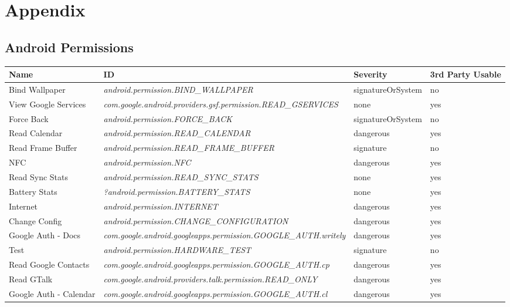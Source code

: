 \chapter{Appendix}
\section{Android Permissions}

\begin{small}
\begin{longtable}{p{3cm}|p{8cm}|p{2.5cm}|p{1.5cm}}
Name & ID & Severity &3rd Party Usable \\
\hline

Bind Wallpaper & \textit{android.permission.\-BIND\_WALLPAPER} & signatureOrSystem & no \\
View Google Services & \textit{com.google.android.providers.gsf.permission.\-READ\_GSERVICES} & none & yes \\
Force Back & \textit{android.permission.\-FORCE\_BACK} & signatureOrSystem & no \\
Read Calendar & \textit{android.permission.\-READ\_CALENDAR} & dangerous & yes \\
Read Frame Buffer & \textit{android.permission.\-READ\_FRAME\_BUFFER} & signature & no \\
NFC & \textit{android.permission.\-NFC} & dangerous & yes \\
Read Sync Stats & \textit{android.permission.\-READ\_SYNC\_STATS} & none & yes \\
Battery Stats & \textit{?android.permission.\-BATTERY\_STATS} & none & yes \\
Internet & \textit{android.permission.\-INTERNET} & dangerous & yes \\
Change Config & \textit{android.permission.\-CHANGE\_CONFIGURATION} & dangerous & yes \\
Google Auth - Docs & \textit{com.google.android.googleapps.permission.\-GOOGLE\_AUTH.writely} & dangerous & yes \\
Test & \textit{android.permission.\-HARDWARE\_TEST} & signature & no \\
Read Google Contacts & \textit{com.google.android.googleapps.permission.\-GOOGLE\_AUTH.cp} & dangerous & yes \\
Read GTalk & \textit{com.google.android.providers.talk.permission.\-READ\_ONLY} & dangerous & yes \\
Google Auth - Calendar & \textit{com.google.android.googleapps.permission.\-GOOGLE\_AUTH.cl} & dangerous & yes \\

\end{longtable}
\end{small}
